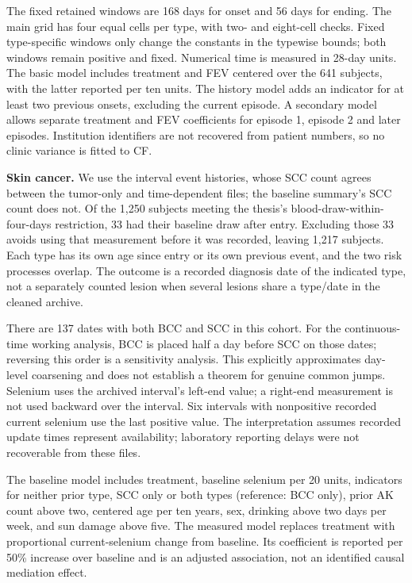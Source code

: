 \documentclass[11pt]{article}
\begin{document}
The fixed retained windows are 168 days for onset and 56 days for ending. The main grid has four equal cells per type, with two- and eight-cell checks. Fixed type-specific windows only change the constants in the typewise bounds; both windows remain positive and fixed. Numerical time is measured in 28-day units. The basic model includes treatment and FEV centered over the 641 subjects, with the latter reported per ten units. The history model adds an indicator for at least two previous onsets, excluding the current episode. A secondary model allows separate treatment and FEV coefficients for episode 1, episode 2 and later episodes. Institution identifiers are not recovered from patient numbers, so no clinic variance is fitted to CF.

\textbf{Skin cancer.} We use the interval event histories, whose SCC count agrees between the tumor-only and time-dependent files; the baseline summary's SCC count does not. Of the 1,250 subjects meeting the thesis's blood-draw-within-four-days restriction, 33 had their baseline draw after entry. Excluding those 33 avoids using that measurement before it was recorded, leaving 1,217 subjects. Each type has its own age since entry or its own previous event, and the two risk processes overlap. The outcome is a recorded diagnosis date of the indicated type, not a separately counted lesion when several lesions share a type/date in the cleaned archive.

There are 137 dates with both BCC and SCC in this cohort. For the continuous-time working analysis, BCC is placed half a day before SCC on those dates; reversing this order is a sensitivity analysis. This explicitly approximates day-level coarsening and does not establish a theorem for genuine common jumps. Selenium uses the archived interval's left-end value; a right-end measurement is not used backward over the interval. Six intervals with nonpositive recorded current selenium use the last positive value. The interpretation assumes recorded update times represent availability; laboratory reporting delays were not recoverable from these files.

The baseline model includes treatment, baseline selenium per 20 units, indicators for neither prior type, SCC only or both types (reference: BCC only), prior AK count above two, centered age per ten years, sex, drinking above two days per week, and sun damage above five. The measured model replaces treatment with proportional current-selenium change from baseline. Its coefficient is reported per 50\% increase over baseline and is an adjusted association, not an identified causal mediation effect.
\end{document}
